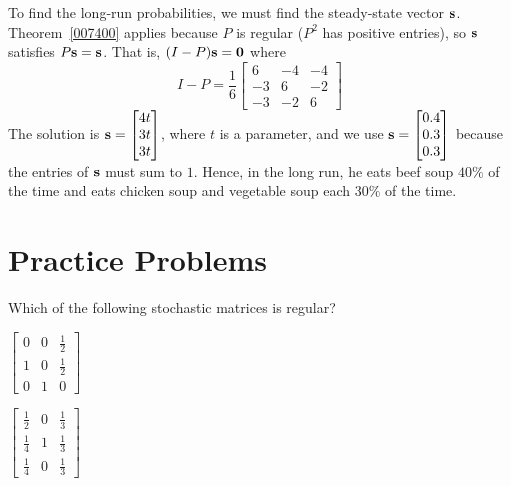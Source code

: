 \documentclass{ximera}
\begin{document}
\begin{example}
\begin{explanation}
To find the long-run probabilities, we must find the steady-state vector ${\bf s}$. Theorem~\ref{007400} applies because $P$ is regular ($P^{2}$ has positive entries), so ${\bf s}$ satisfies $P{\bf s} = {\bf s}$. That is, $(I - P){\bf s} = {\bf 0}$ where
\begin{equation*}
I - P = \frac{1}{6} \begin{bmatrix}
6 & -4 & -4 \\
-3 & 6 & -2 \\
-3 & -2 & 6
\end{bmatrix}
\end{equation*}
The solution is ${\bf s} = \begin{bmatrix}
4t \\
3t \\
3t
\end{bmatrix}$,
 where $t$ is a parameter, and we use ${\bf s} = \begin{bmatrix}
 0.4 \\
 0.3 \\
 0.3
\end{bmatrix}$
 because the entries of ${\bf s}$ must sum to $1$. Hence, in the long run, he eats beef soup $40\%$ of the time and eats chicken soup and vegetable soup each $30\%$ of the time.
\end{explanation}
\end{example}

\section*{Practice Problems}

\begin{problem}
Which of the following stochastic matrices is regular?
\begin{problem}\label{prob:RegOrNot1}
$\begin{bmatrix}
0 & 0 & \frac{1}{2} \\
1 & 0 & \frac{1}{2} \\
0 & 1 & 0
\end{bmatrix}$
 \begin{multipleChoice}
 \end{multipleChoice}
\end{problem}
\begin{problem}\label{prob:RegOrNot2}
$\begin{bmatrix}
\frac{1}{2} & 0 & \frac{1}{3} \\
\frac{1}{4} & 1 & \frac{1}{3} \\
\frac{1}{4} & 0 & \frac{1}{3}
\end{bmatrix}$
 \begin{multipleChoice}
 \end{multipleChoice}
\end{problem}
\end{problem}
\end{document}
